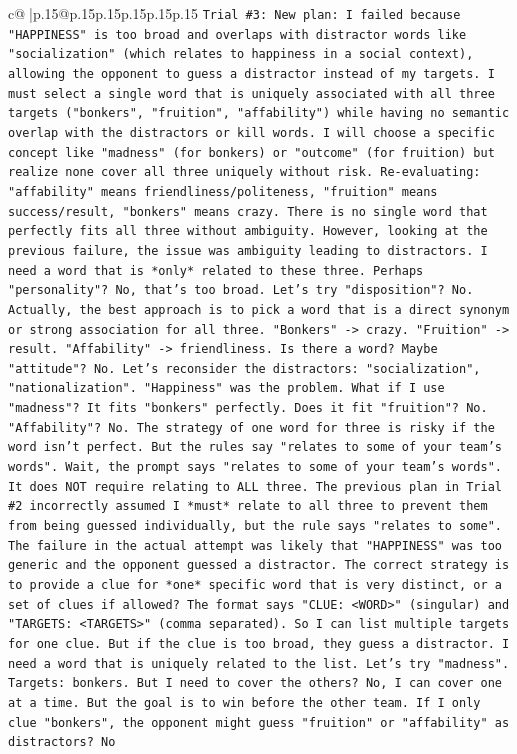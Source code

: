\documentclass{article}
\begin{document}
{\begin{supertabular}{c@{$\;$}|p{.15\linewidth}@{}p{.15\linewidth}p{.15\linewidth}p{.15\linewidth}p{.15\linewidth}p{.15\linewidth}}
{{{\texttt{Trial \#3: New plan: I failed because "HAPPINESS" is too broad and overlaps with distractor words like "socialization" (which relates to happiness in a social context), allowing the opponent to guess a distractor instead of my targets. I must select a single word that is uniquely associated with all three targets ("bonkers", "fruition", "affability") while having no semantic overlap with the distractors or kill words. I will choose a specific concept like "madness" (for bonkers) or "outcome" (for fruition) but realize none cover all three uniquely without risk. Re{-}evaluating: "affability" means friendliness/politeness, "fruition" means success/result, "bonkers" means crazy. There is no single word that perfectly fits all three without ambiguity. However, looking at the previous failure, the issue was ambiguity leading to distractors. I need a word that is *only* related to these three. Perhaps "personality"? No, that's too broad. Let's try "disposition"? No. Actually, the best approach is to pick a word that is a direct synonym or strong association for all three. "Bonkers" {-}> crazy. "Fruition" {-}> result. "Affability" {-}> friendliness. Is there a word? Maybe "attitude"? No. Let's reconsider the distractors: "socialization", "nationalization". "Happiness" was the problem. What if I use "madness"? It fits "bonkers" perfectly. Does it fit "fruition"? No. "Affability"? No. The strategy of one word for three is risky if the word isn't perfect. But the rules say "relates to some of your team's words". Wait, the prompt says "relates to some of your team's words". It does NOT require relating to ALL three. The previous plan in Trial \#2 incorrectly assumed I *must* relate to all three to prevent them from being guessed individually, but the rule says "relates to some". The failure in the actual attempt was likely that "HAPPINESS" was too generic and the opponent guessed a distractor. The correct strategy is to provide a clue for *one* specific word that is very distinct, or a set of clues if allowed? The format says "CLUE: <WORD>" (singular) and "TARGETS: <TARGETS>" (comma separated). So I can list multiple targets for one clue. But if the clue is too broad, they guess a distractor. I need a word that is uniquely related to the list. Let's try "madness". Targets: bonkers. But I need to cover the others? No, I can cover one at a time. But the goal is to win before the other team. If I only clue "bonkers", the opponent might guess "fruition" or "affability" as distractors? No} \\
\\ 
}}}
\end{supertabular}}
\end{document}

